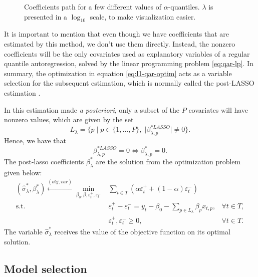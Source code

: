 \begin{figure}
\begin{minipage}[t]{0.4\linewidth}
\begin{minipage}[b]{\linewidth}
			\label{fig:npqar-cross}
		\end{minipage}
	\end{minipage}
	\caption{Coefficients path for a few different values of $\alpha$-quantiles. $\lambda$ is presented in a $\log_{10}$ scale, to make visualization easier.}
	\label{fig:npqar-results}
\end{figure}

It is important to mention that even though we have coefficients that are estimated by this method, we don't use them directly. Instead, the nonzero coefficients will be the only covariates used as explanatory variables of a regular quantile autoregression, solved by the linear programming problem \ref{eq:qar-lp}. In summary, the optimization in equation \ref{eq:l1-qar-optim} acts as a variable selection for the subsequent estimation, which is normally called the post-LASSO estimation \cite{belloni2009least}.

In this estimation made \textit{a posteriori}, only a subset of the $P$ covariates will have nonzero values, which are given by the set 
\begin{equation*}
L_\lambda = \{ p \; | \; p \in \{ 1,\dots,P \}, \; |\beta^{*LASSO}_{\lambda,p}| \neq 0  \}.
\end{equation*}
Hence, we have that
$$\beta^{*LASSO}_{\lambda,p} = 0 \iff \beta^{*}_{\lambda,p} = 0.$$
The post-lasso coefficients $\beta_\lambda^*$ are the solution from the optimization problem given below:
\begin{equation}
\begin{aligned} (\hat{\sigma}_{\lambda}^{*},\beta_{\lambda}^{*})\overset{(obj,var)}{\longleftarrow} \min_{\beta_0,\beta,\varepsilon_{t}^{+},\varepsilon_{t}^{-}} & \sum_{t \in T}\left(\alpha\varepsilon_{t}^{+}+(1-\alpha)\varepsilon_{t}^{-}\right) \\
\mbox{s.t. } & \varepsilon_{t}^{+}-\varepsilon_{t}^{-}=y_{t} - \beta_0 - \sum_{p\in L_\lambda} \beta_p x_{t,p},& \forall t\in T,\\
& \varepsilon_t^+,\varepsilon_t^- \geq 0, & \forall t \in T.
\end{aligned}
\label{eq:post-lasso}
\end{equation}
The variable $\hat{\sigma}_{\lambda}^{*}$ receives the value of the objective function on its optimal solution.






\subsection{Model selection}

